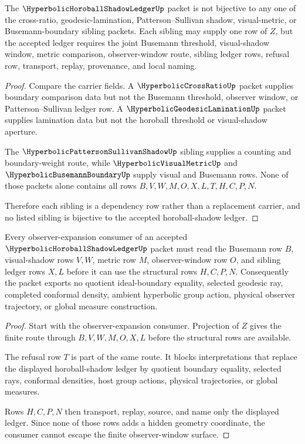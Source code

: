 \begin{theorem}
\label{thm:hyperbolic-horoball-shadow-ledger-sibling-independence}
The $\HyperbolicHoroballShadowLedgerUp$ packet is not bijective to any one of the cross-ratio, geodesic-lamination, Patterson--Sullivan shadow, visual-metric, or Busemann-boundary sibling packets. Each sibling may supply one row of $Z$, but the accepted ledger requires the joint Busemann threshold, visual-shadow window, metric comparison, observer-window route, sibling ledger rows, refusal row, transport, replay, provenance, and local naming.
\end{theorem}
\begin{proof}
Compare the carrier fields. A $\HyperbolicCrossRatioUp$ packet supplies boundary comparison data but not the Busemann threshold, observer window, or Patterson--Sullivan ledger row. A $\HyperbolicGeodesicLaminationUp$ packet supplies lamination data but not the horoball threshold or visual-shadow aperture.

The $\HyperbolicPattersonSullivanShadowUp$ sibling supplies a counting and boundary-weight route, while $\HyperbolicVisualMetricUp$ and $\HyperbolicBusemannBoundaryUp$ supply visual and Busemann rows. None of those packets alone contains all rows $B,V,W,M,O,X,L,T,H,C,P,N$.

Therefore each sibling is a dependency row rather than a replacement carrier, and no listed sibling is bijective to the accepted horoball-shadow ledger.
\end{proof}

\begin{theorem}
\label{thm:hyperbolic-horoball-shadow-ledger-observer-window-nonescape}
Every observer-expansion consumer of an accepted $\HyperbolicHoroballShadowLedgerUp$ packet must read the Busemann row $B$, visual-shadow rows $V,W$, metric row $M$, observer-window row $O$, and sibling ledger rows $X,L$ before it can use the structural rows $H,C,P,N$. Consequently the packet exports no quotient ideal-boundary equality, selected geodesic ray, completed conformal density, ambient hyperbolic group action, physical observer trajectory, or global measure construction.
\end{theorem}
\begin{proof}
Start with the observer-expansion consumer. Projection of $Z$ gives the finite route through $B,V,W,M,O,X,L$ before the structural rows are available.

The refusal row $T$ is part of the same route. It blocks interpretations that replace the displayed horoball-shadow ledger by quotient boundary equality, selected rays, conformal densities, host group actions, physical trajectories, or global measures.

Rows $H,C,P,N$ then transport, replay, source, and name only the displayed ledger. Since none of those rows adds a hidden geometry coordinate, the consumer cannot escape the finite observer-window surface.
\end{proof}


